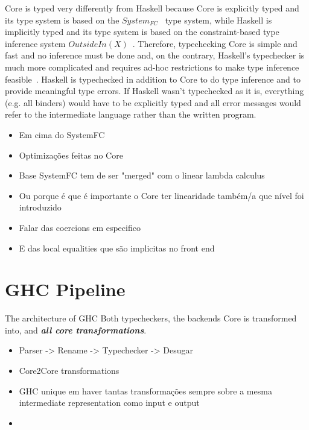 \documentclass[]{lwnovathesis}
\begin{document}
Core is typed very differently from Haskell because Core is explicitly typed and
its type system is based on the $System_{FC}$~\cite{systemfc} type system, while
Haskell is implicitly typed and its type system is based on the constraint-based
type inference system $OutsideIn(X)$~\cite{outsideinx}. Therefore, typechecking
Core is simple and fast and no inference must be done and, on the contrary,
Haskell's typechecker is much more complicated and requires ad-hoc restrictions
to make type inference feasible~\cite{}.
%
Haskell is typechecked in addition to Core to do type inference and to provide
meaningful type errors. If Haskell wasn't typechecked as it is, everything (e.g.
all binders) would have to be explicitly typed and all error messages would
refer to the intermediate language rather than the written program.



\begin{itemize}
    \item Em cima do SystemFC
    \item Optimizações feitas no Core
    \item Base SystemFC tem de ser "merged" com o linear lambda calculus
    \item Ou porque é que é importante o Core ter linearidade também/a que nível
        foi introduzido
    \item Falar das coercions em especifico
    \item E das local equalities que são implicitas no front end
\end{itemize}

\section{GHC Pipeline}

The architecture of GHC
Both typecheckers, the backends Core is transformed into, and \textbf{\emph{all
core transformations}}.

\begin{itemize}
    \item Parser -> Rename -> Typechecker -> Desugar
    \item Core2Core transformations
    \item GHC unique em haver tantas transformações sempre sobre a mesma intermediate
        representation como input e output
    \item 
\end{itemize}
\end{document}
